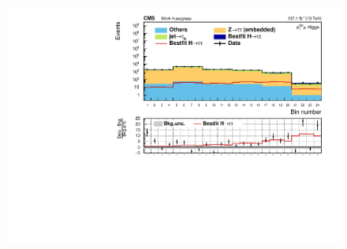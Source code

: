 \begin{figure}[!ht]
        \centering
        \includegraphics[scale=0.65]{Chapitre7/Images/histSig.pdf} 
        \vspace{0.5ex}
    \caption{}
    \label{SIGcategory}
\end{figure}